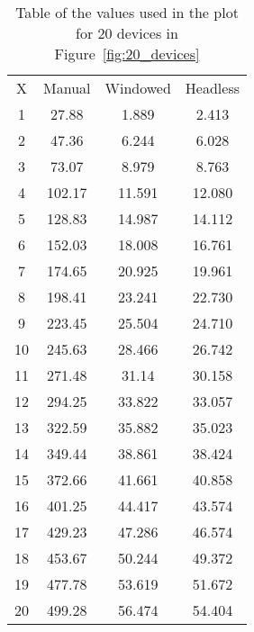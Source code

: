 \begin{table}[]
    \centering
    \begin{tabular}{c c c c}
    X & Manual & Windowed & Headless  \\
    1 & 27.88 & 1.889 & 2.413  \\
    2 & 47.36 & 6.244 & 6.028  \\
    3 & 73.07 & 8.979 & 8.763 \\
    4 & 102.17 & 11.591 & 12.080  \\
    5 & 128.83 & 14.987 & 14.112  \\
    6 & 152.03 & 18.008 & 16.761  \\
    7 & 174.65 & 20.925 & 19.961  \\
    8 & 198.41 & 23.241 & 22.730  \\
    9 & 223.45 & 25.504 & 24.710  \\
    10 & 245.63 & 28.466 & 26.742  \\
    11 & 271.48 & 31.14 & 30.158  \\
    12 & 294.25 & 33.822 & 33.057  \\
    13 & 322.59 & 35.882 & 35.023  \\
    14 & 349.44 & 38.861 & 38.424  \\
    15 & 372.66 & 41.661 & 40.858  \\
    16 & 401.25 & 44.417 & 43.574  \\
    17 & 429.23 & 47.286 & 46.574  \\
    18 & 453.67 & 50.244 & 49.372  \\
    19 & 477.78 & 53.619 & 51.672  \\
    20 & 499.28 & 56.474 & 54.404  \\
\end{tabular}
    \caption{Table of the values used in the plot for 20 devices in Figure~\ref{fig:20_devices}}
    \label{tab:20_devices}
\end{table}

